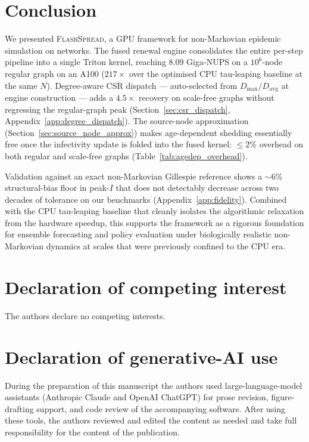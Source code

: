 \documentclass[a4paper,fleqn]{cas-sc}
\theoremstyle{definition}
\theoremstyle{remark}
\newcommand{\flashspread}{\textsc{FlashSpread}}
\begin{document}
\section{Conclusion}\label{sec:conclusion}

We presented \flashspread{}, a GPU framework for non-Markovian epidemic simulation on networks. The fused renewal engine consolidates the entire per-step pipeline into a single Triton kernel, reaching 8.09 Giga-NUPS on a $10^6$-node regular graph on an A100 ($217\times$ over the optimised CPU tau-leaping baseline at the same $N$). Degree-aware CSR dispatch --- auto-selected from $D_{\max}/D_{\mathrm{avg}}$ at engine construction --- adds a $4.5\times$ recovery on scale-free graphs without regressing the regular-graph peak (Section~\ref{sec:csr_dispatch}, Appendix~\ref{app:degree_dispatch}). The source-node approximation (Section~\ref{sec:source_node_approx}) makes age-dependent shedding essentially free once the infectivity update is folded into the fused kernel: $\leq 2\%$ overhead on both regular and scale-free graphs (Table~\ref{tab:agedep_overhead}).

Validation against an exact non-Markovian Gillespie reference shows a $\sim$6\% structural-bias floor in peak-$I$ that does not detectably decrease across two decades of tolerance on our benchmarks (Appendix~\ref{app:fidelity}). Combined with the CPU tau-leaping baseline that cleanly isolates the algorithmic relaxation from the hardware speedup, this supports the framework as a rigorous foundation for ensemble forecasting and policy evaluation under biologically realistic non-Markovian dynamics at scales that were previously confined to the CPU era.

\section*{Declaration of competing interest}

The authors declare no competing interests.

\section*{Declaration of generative-AI use}

During the preparation of this manuscript the authors used large-language-model assistants (Anthropic Claude and OpenAI ChatGPT) for prose revision, figure-drafting support, and code review of the accompanying software. After using these tools, the authors reviewed and edited the content as needed and take full responsibility for the content of the publication.
\end{document}
